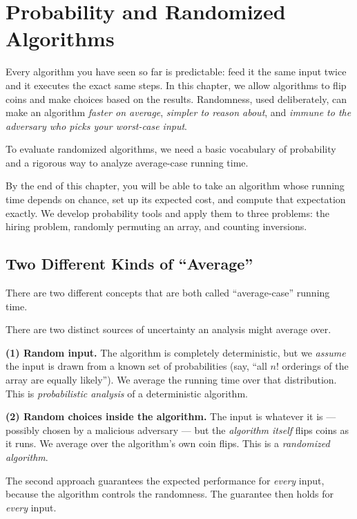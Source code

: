 \chapter{Probability and Randomized Algorithms}

\providecommand{\E}{\ensuremath{\mathbb{E}}}

Every algorithm you have seen so far is predictable: feed it
the same input twice and it executes the exact same steps. In
this chapter, we allow algorithms to flip coins and make choices based on the results. Randomness, used deliberately, can make an algorithm \emph{faster on average}, \emph{simpler to reason about}, and \emph{immune to the adversary who picks your worst-case input}.

To evaluate randomized algorithms, we need a basic vocabulary of probability and a rigorous way to analyze average-case running time.

\begin{focusbox}
By the end of this chapter, you will be able to take an algorithm whose
running time depends on chance, set up its expected cost, and compute that
expectation exactly. We develop probability tools and apply them to three problems: the hiring problem, randomly permuting an array, and counting inversions.
\end{focusbox}

\section{Two Different Kinds of ``Average''}

There are two different concepts that are both called ``average-case'' running time.

\begin{intuitionbox}
There are two distinct sources of uncertainty an analysis might average over.

\textbf{(1) Random input.} The algorithm is completely deterministic, but we
\emph{assume} the input is drawn from a known set of probabilities (say,
``all $n!$ orderings of the array are equally likely''). We average the running
time over that distribution. This is \emph{probabilistic analysis} of a
deterministic algorithm.

\textbf{(2) Random choices inside the algorithm.} The input is whatever it is ---
possibly chosen by a malicious adversary --- but the \emph{algorithm itself}
flips coins as it runs. We average over the algorithm's own coin flips. This is a
\emph{randomized algorithm}.

The second approach guarantees the expected performance for \emph{every} input, because the algorithm controls the randomness. The guarantee then holds for \emph{every} input.
\end{intuitionbox}

